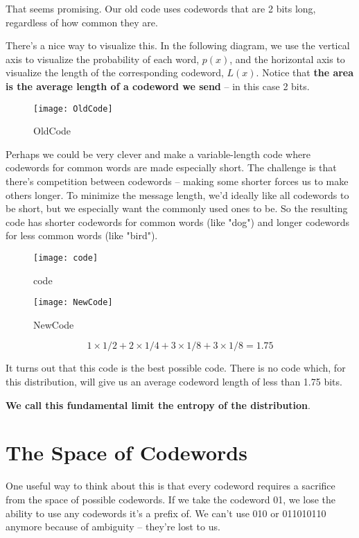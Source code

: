 That seems promising. Our old code uses codewords that are 2 bits long, regardless of how common they are.

There's a nice way to visualize this. In the following diagram, we use the vertical axis to visualize the probability of each word, $p(x)$,
and the horizontal axis to visualize the length of the corresponding codeword, $L(x)$.
Notice that \textbf{the area is the average length of a codeword we send} – in this case 2 bits.

\begin{figure}[htbp]
  \centering
  \texttt{[image: OldCode]}\\
  \caption{OldCode}\label{fig.entropy.OldCode}
\end{figure}

Perhaps we could be very clever and make a variable-length code where codewords for common words are made especially short.
The challenge is that there's competition between codewords – making some shorter forces us to make others longer.
To minimize the message length, we'd ideally like all codewords to be short, but we especially want the commonly used ones to be.
So the resulting code has shorter codewords for common words (like "dog") and longer codewords for less common words (like "bird").

\begin{figure}[htbp]
  \centering
  \texttt{[image: code]}\\
  \caption{code}\label{fig.entropy.code}
\end{figure}

\begin{figure}[htbp]
  \centering
  \texttt{[image: NewCode]}\\
  \caption{NewCode}\label{fig.entropy.NewCode}
\end{figure}
$$ 1 \times 1/2 + 2 \times 1/4 + 3 \times 1/8 + 3 \times 1/8 = 1.75$$

It turns out that this code is the best possible code.
There is no code which, for this distribution, will give us an average codeword length of less than 1.75 bits.

\textbf{We call this fundamental limit the entropy of the distribution}.

\section{The Space of Codewords}
One useful way to think about this is that every codeword requires a sacrifice from the space of possible codewords.
If we take the codeword 01, we lose the ability to use any codewords it's a prefix of.
We can't use 010 or 011010110 anymore because of ambiguity – they're lost to us.

